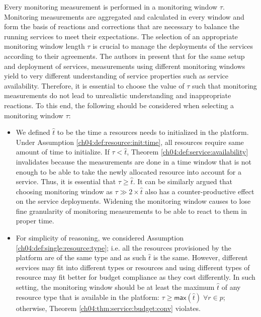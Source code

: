 Every monitoring measurement is performed in a monitoring window $\tau$.
Monitoring measurements are aggregated and calculated in every window and form the basis of reactions and corrections that are necessary to balance the running services to meet their expectations.
The selection of an appropriate monitoring window length $\tau$ is crucial to manage the deployments of the services according to their agreements. 
The authors in \cite{hogben2013defavail} present that for the same setup and deployment of services, measurements using different monitoring windows yield to very different understanding of service properties such as service availability.
Therefore, it is essential to choose the value of $\tau$ such that monitoring measurements do not lead to unrealistic understanding and inappropriate reactions.
To this end, the following should be considered when selecting a monitoring window $\tau$:
\begin{itemize}
\item We defined $\hat{t}$ to be the time a resources needs to initialized in the platform.
Under Assumption \ref{ch04:def:resource:init:time}, all resources require same amount of time to initialize.
If $\tau < \hat{t}$, Theorem \ref{ch04:def:service:availability} invalidates because the measurements are done in a time window that is not enough to be able to take the newly allocated resource into account for a service.
Thus, it is essential that $\tau \geq \hat{t}$.
It can be similarly argued that choosing monitoring window as $\tau \gg 2 \times \hat{t}$ also has a counter-productive effect on the service deployments.
Widening the monitoring window causes to lose fine granularity of monitoring measurements to be able to react to them in proper time.
\item For simplicity of reasoning, we considered Assumption \ref{ch04:def:single:resource:type};
i.e. all the resources provisioned by the platform are of the same type and as such $\hat{t}$ is the same.
However, different services may fit into different types or resources and using different types of resource may fit better for budget compliance as they cost differently.
In such setting, the monitoring window should be at least the maximum $\hat{t}$ of any resource type that is available in the platform: $\tau \geq \mathsf{max}(\hat{t}) \; \forall r \in p$; otherwise, Theorem \ref{ch04:thm:service:budget:conv} violates.
\end{itemize}

